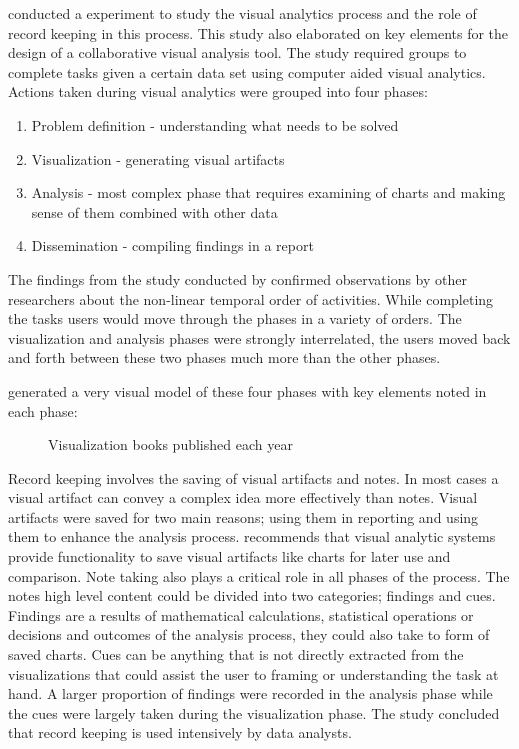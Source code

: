 \cite{mahyar2010closer} conducted a experiment to study the visual analytics process and the role of record keeping in this process. This study also elaborated on key elements for the design of a collaborative visual analysis tool. The study required groups to complete tasks given a certain data set using computer aided visual analytics.
Actions taken during visual analytics were grouped into four phases:
\begin{enumerate}
	\item Problem definition - understanding what needs to be solved
	\item Visualization - generating visual artifacts
	\item Analysis - most complex phase that requires examining of charts and making sense of them combined with other data
	\item Dissemination - compiling findings in a report
\end{enumerate}
The findings from the study conducted by \cite{mahyar2010closer} confirmed observations by other researchers about the non-linear temporal order of activities. While completing the tasks users would move through the phases in a variety of orders. The visualization and analysis phases were strongly interrelated, the users moved back and forth between these two phases much more than the other phases.

\cite{mahyar2010closer} generated a very visual model of these four phases with key elements noted in each phase:
\begin{figure}[!ht]
	\centering{}
	\caption{Visualization books published each year}\label{fig:2}
\end{figure}

Record keeping involves the saving of visual artifacts and notes. In most cases a visual artifact can convey a complex idea more effectively than notes. Visual artifacts were saved for two main reasons; using them in reporting and using them to enhance the analysis process.\cite{mahyar2010closer} recommends that visual analytic systems provide functionality to save visual artifacts like charts for later use and comparison. Note taking also plays a critical role in all phases of the process. The notes high level content could be divided into two categories; findings and cues. Findings are a results of mathematical calculations, statistical operations or decisions and outcomes of the analysis process, they could also take to form of saved charts. Cues can be anything that is not directly extracted from the visualizations that could assist the user to framing or understanding the task at hand. A larger proportion of findings were recorded in the analysis phase while the cues were largely taken during the visualization phase. The study concluded that record keeping is used intensively by data analysts.

